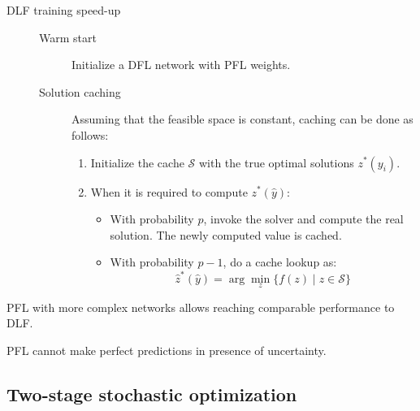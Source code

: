 \begin{description}
        \begin{description}
            \item[DLF training speed-up] \phantom{}
            \begin{description}
                \item[Warm start] 
                    Initialize a DFL network with PFL weights.
    
                \item[Solution caching] 
                    Assuming that the feasible space is constant, caching can be done as follows:
                    \begin{enumerate}
                        \item Initialize the cache $\mathcal{S}$ with the true optimal solutions $z^*(y_i)$.
                        \item When it is required to compute $z^*(\hat{y})$:
                        \begin{itemize}
                            \item With probability $p$, invoke the solver and compute the real solution. The newly computed value is cached.
                            \item With probability $p-1$, do a cache lookup as:
                            \[ \hat{z}^*(\hat{y}) = \arg\min_z \{ f(z) \mid z \in \mathcal{S} \} \]
                        \end{itemize}
                    \end{enumerate}
            \end{description}
        \end{description}
\end{description}

\begin{remark}
    PFL with more complex networks allows reaching comparable performance to DLF.
\end{remark}

\begin{remark}
    PFL cannot make perfect predictions in presence of uncertainty.
\end{remark}


\subsection{Two-stage stochastic optimization}

